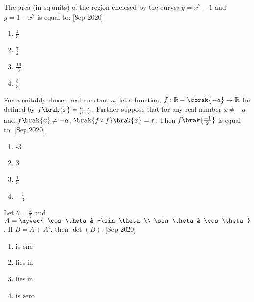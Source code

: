     \item{
            The area (in sq.units) of the region enclosed by the curves $y = x^2-1$ and $y = 1-x^2$ is equal to:
             \hfill
                {[Sep 2020]}
            \begin{multicols}{4}
                \begin{enumerate}
                    \item $\frac{4}{3}$
                   	\item $\frac{7}{2}$
                   	\item $\frac{16}{3}$
                    \item $\frac{8}{3}$
                \end{enumerate}
            \end{multicols}
        
        }
    \item{
            For a suitably chosen real constant $a$, let a function, $f: \mathbb{R} - \cbrak{-a} \rightarrow \mathbb{R}$ be defined by $f\brak{x} = \frac{a-x}{a+x}$. Further suppose that for any real number $x \neq -a$ and $f\brak{x} \neq -a$, $\brak{f \circ f}\brak{x} = x$. Then $f\brak{\frac{-1}{2}}$ is equal to:
             \hfill
                {[Sep 2020]}
			\begin{multicols}{4}
				\begin{enumerate}
					\item -3
					\item 3
					\item $\frac{1}{3}$
					\item $-\frac{1}{3}$
				\end{enumerate}
			\end{multicols}
        
        }
    \item{
        
            Let $\theta = \frac{\pi}{5}$ and $A = \myvec{ \cos\theta & -\sin\theta \\ \sin\theta & \cos\theta}$. If $B = A + A^4$, then $\det(B)$:
             \text{   }\hfill
                {[Sep 2020]}
            \begin{multicols}{2}
                \begin{enumerate}
                   	\item is one
                    \item lies in 
                    \item lies in 
                    \item is zero
                \end{enumerate}
            \end{multicols}
        
        }
